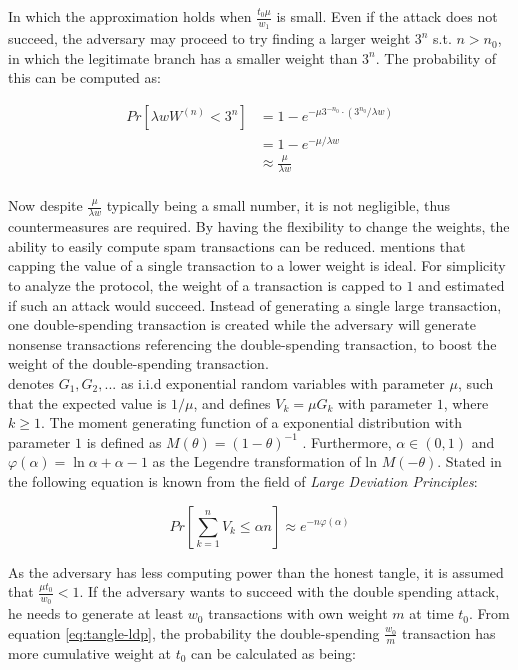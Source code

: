 In which the approximation holds when $\frac{t_0 \mu}{w_1}$ is small. Even if the attack does not succeed, the adversary may proceed to try finding a larger weight $3^n$ s.t. $n > n_0$, in which the legitimate branch has a smaller weight than $3^n$. The probability of this can be computed as:

\begin{align*}
    Pr[\lambda w W^{(n)} < 3^n] &= 1 - e^{-\mu 3^{-n_0} \cdot (3^{n_0}/\lambda w)}\\
    &= 1 - e^{-\mu / \lambda w} \\
    &\approx \frac{\mu}{\lambda w} \\
\end{align*}

Now despite $\frac{\mu}{\lambda w}$ typically being a small number, it is not negligible, thus countermeasures are required. By having the flexibility to change the weights, the ability to easily compute spam transactions can be reduced. \cite{tangle} mentions that capping the value of a single transaction to a lower weight is ideal. For simplicity to analyze the protocol, the weight of a transaction is capped to $1$ and estimated if such an attack would succeed. Instead of generating a single large transaction, one double-spending transaction is created while the adversary will generate nonsense transactions referencing the double-spending transaction, to boost the weight of the double-spending transaction.\\


 \cite{tangle} denotes $G_1, G_2, ...$ as i.i.d exponential random variables with parameter $\mu$, such that the expected value is $1/\mu$, and defines $V_k = \mu G_k$ with parameter $1$, where $k \geq 1$. The moment generating function of a exponential distribution with parameter $1$ is defined as $M(\theta) = (1 - \theta)^{-1}$ \cite{Moment-generating-function}. Furthermore, $\alpha \in (0,1)$ and $\varphi(\alpha) = \ln \alpha + \alpha - 1$ as the Legendre transformation of ln $M(-\theta)$. Stated in \cite{tangle} the following equation is known from the field of \emph{Large Deviation Principles}:

\begin{equation}
\label{eq:tangle-ldp}
    Pr[\sum_{k=1}^n V_k \leq \alpha n] \approx e^{-n \varphi(\alpha)}
\end{equation}

As the adversary has less computing power than the honest tangle, it is assumed that $\frac{\mu t_0}{w_0} < 1$. If the adversary wants to succeed with the double spending attack, he needs to generate at least $w_0$ transactions with own weight $m$ at time $t_0$. From equation \ref{eq:tangle-ldp}, the probability the double-spending $\frac{w_0}{m}$ transaction has more cumulative weight at $t_0$ can be calculated as being:

